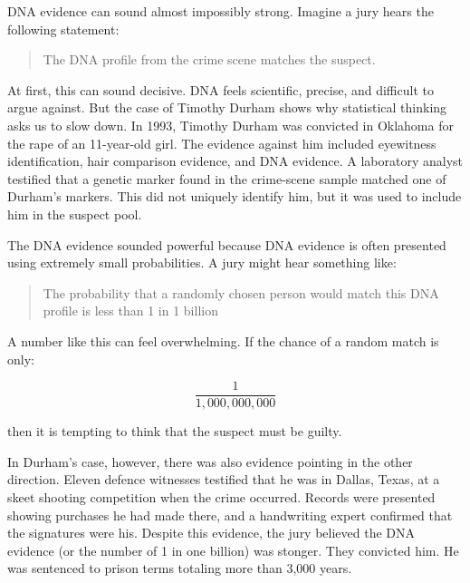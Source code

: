 \documentclass[
  letterpaper,
  DIV=11,
  numbers=noendperiod]{scrreprt}
\begin{document}
\begin{tcolorbox}[enhanced jigsaw, arc=.35mm, bottomrule=.15mm, bottomtitle=1mm, breakable, colback=white, colbacktitle=quarto-callout-note-color!10!white, colframe=quarto-callout-note-color-frame, coltitle=black, left=2mm, leftrule=.75mm, opacityback=0, opacitybacktitle=0.6, rightrule=.15mm, title=\textcolor{quarto-callout-note-color}{\faInfo}\hspace{0.5em}{Case Study: Timothy Durham}, titlerule=0mm, toprule=.15mm, toptitle=1mm]

DNA evidence can sound almost impossibly strong. Imagine a jury hears
the following statement:

\begin{quote}
The DNA profile from the crime scene matches the suspect.
\end{quote}

At first, this can sound decisive. DNA feels scientific, precise, and
difficult to argue against. But the case of Timothy Durham shows why
statistical thinking asks us to slow down. In 1993, Timothy Durham was
convicted in Oklahoma for the rape of an 11-year-old girl. The evidence
against him included eyewitness identification, hair comparison
evidence, and DNA evidence. A laboratory analyst testified that a
genetic marker found in the crime-scene sample matched one of Durham's
markers. This did not uniquely identify him, but it was used to include
him in the suspect pool.

The DNA evidence sounded powerful because DNA evidence is often
presented using extremely small probabilities. A jury might hear
something like:

\begin{quote}
The probability that a randomly chosen person would match this DNA
profile is less than 1 in 1 billion
\end{quote}

A number like this can feel overwhelming. If the chance of a random
match is only:

\[\frac{1}{1,000,000,000}\]

then it is tempting to think that the suspect must be guilty.

In Durham's case, however, there was also evidence pointing in the other
direction. Eleven defence witnesses testified that he was in Dallas,
Texas, at a skeet shooting competition when the crime occurred. Records
were presented showing purchases he had made there, and a handwriting
expert confirmed that the signatures were his. Despite this evidence,
the jury believed the DNA evidence (or the number of 1 in one billion)
was stonger. They convicted him. He was sentenced to prison terms
totaling more than 3,000 years.


\end{tcolorbox}
\end{document}
